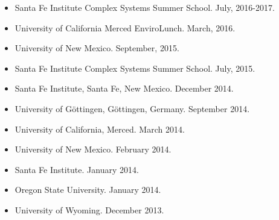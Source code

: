\documentclass[margin,line,12pt]{res}
\begin{document}
\begin{resume}
\begin{itemize}
\item Santa Fe Institute Complex Systems Summer School. July, 2016-2017.

\item University of California Merced EnviroLunch. March, 2016.

\item University of New Mexico. September, 2015.

\item Santa Fe Institute Complex Systems Summer School. July, 2015.

\item Santa Fe Institute, Santa Fe, New Mexico. December 2014.

\item University of G\"ottingen, G\"ottingen, Germany. September 2014.

\item University of California, Merced. March 2014.

\item University of New Mexico. February 2014.

\item Santa Fe Institute. January 2014.

\item Oregon State University. January 2014.

\item University of Wyoming. December 2013.


\end{itemize}
\end{resume}
\end{document}
